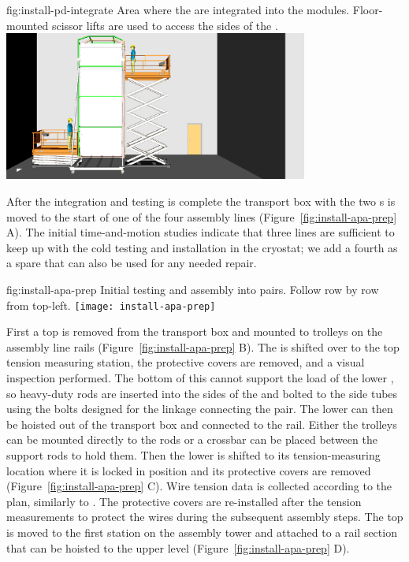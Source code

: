 \begin{dunefigure}
{fig:install-pd-integrate}
{Area where the  are integrated into the  modules. Floor-mounted scissor lifts are used to access the sides of the .}
\includegraphics[width=0.75\textwidth]{graphics/install-pd-integrate.pdf}
\end{dunefigure}

After the  integration and testing is complete the transport box with the two s is moved to the start of one of the four assembly lines (Figure~\ref{fig:install-apa-prep} A). 
The initial time-and-motion studies indicate that three lines are sufficient to keep up with the cold testing and installation in the cryostat; we add a fourth as a spare that can also be used for any needed repair. 

\begin{dunefigure}
{fig:install-apa-prep}
{Initial  testing and assembly into pairs.  Follow row by row from top-left.} 
\texttt{[image: install-apa-prep]}
\end{dunefigure}


First a top  is removed from the transport box and mounted to trolleys on the assembly line rails (Figure~\ref{fig:install-apa-prep} B). 
The  is shifted over to the top  tension measuring station, the protective covers are removed, and a visual inspection performed. 
The bottom of this  cannot support the load of the lower , so heavy-duty rods are inserted into the sides of the  and bolted to the side tubes using the bolts designed for the linkage connecting the  pair. 
The lower  can then be hoisted out of the transport box and connected to the rail. 
Either the trolleys can be mounted directly to the rods or  a crossbar can be placed between the support rods to hold them.  
Then the lower  is shifted to its tension-measuring location where it is locked in position and its protective covers are removed (Figure~\ref{fig:install-apa-prep} C). 
Wire tension data is collected according to the  plan, similarly to . 
The protective covers are re-installed after the tension measurements to protect the wires during the subsequent assembly steps. 
The top  is moved to the first station on the  assembly tower and attached to a rail section that can be hoisted to the upper level (Figure~\ref{fig:install-apa-prep} D). 
 
